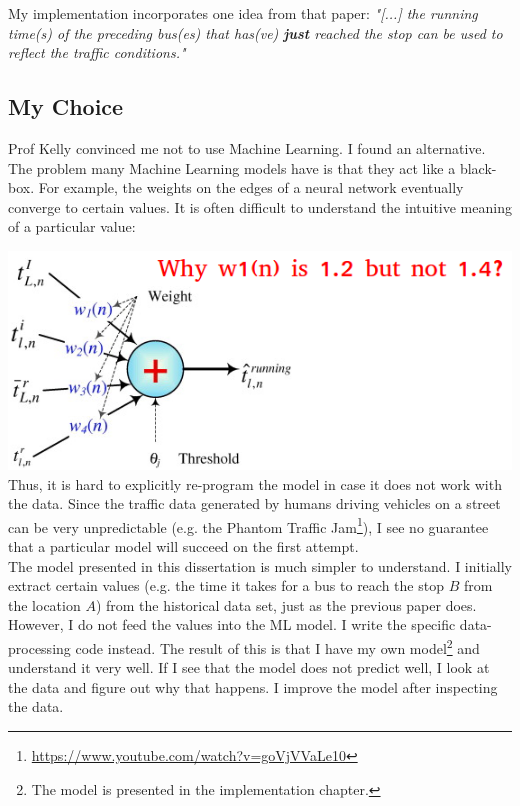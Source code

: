 \documentclass[12pt,a4paper,oneside,openright]{report}
\begin{document}
My implementation incorporates one idea from that paper:
\textit{"[...] the running time(s) of the preceding bus(es) that has(ve) \textbf{just}
reached the stop can be used to reflect the traffic conditions."} \\


\subsection{My Choice}

Prof Kelly convinced me not to use Machine Learning. I found an alternative.
The problem many Machine Learning models have is that they act like a black-box. For example,
the weights on the edges of a neural network eventually converge to certain values. It is often
difficult to understand the intuitive meaning of a particular value:

\includegraphics[width=\textwidth]{figs/ann.png} \\

Thus, it is hard to explicitly re-program the model in case it does not work with the data.
Since the traffic data generated by humans driving vehicles on a street can be very
unpredictable (e.g. the Phantom Traffic
Jam\footnote{\textcolor{blue}{\url{https://www.youtube.com/watch?v=goVjVVaLe10}}}),
I see no guarantee that a particular model will succeed on the first attempt. \\

The model presented in this dissertation is much simpler to understand. I initially extract
certain values (e.g. the time it takes for a bus to reach the stop $B$ from the location $A$)
from the historical data set, just as the previous paper does. However, I do not feed the values
into the ML model. I write the specific data-processing code instead. The result of this is that
I have my own model\footnote{The model is presented in the
implementation chapter.} and understand it very well. If I see that the model does not predict
well, I look at the data and figure out why that happens. I improve the model after inspecting
the data. \\
\end{document}
